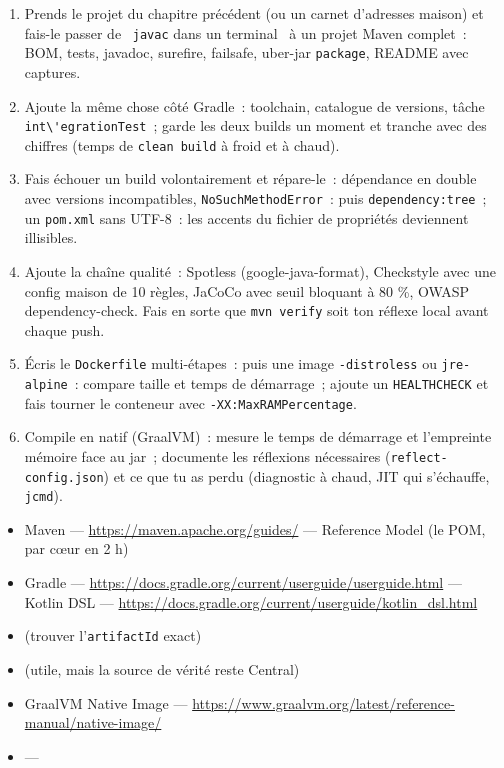 \begin{exercice}
\begin{enumerate}
  \item Prends le projet du chapitre pr\'ec\'edent (ou un carnet d'adresses maison) et fais-le passer
        de \og ~\verb|javac| dans un terminal~ \fg{} \`a un projet Maven complet~: BOM, tests, javadoc,
        surefire, failsafe, uber-jar \verb|package|, README avec captures.
  \item Ajoute la m\^eme chose c\^ot\'e Gradle~: toolchain, catalogue de versions, t\^ache
        \verb|int\'egrationTest|~; garde les deux builds un moment et tranche avec des chiffres
        (temps de \verb|clean build| \`a froid et \`a chaud).
  \item Fais \'echouer un build volontairement et r\'epare-le~: d\'ependance en double avec versions
        incompatibles, \verb|NoSuchMethodError|~: puis \verb|dependency:tree|~; un \verb|pom.xml|
        sans UTF-8~: les accents du fichier de propri\'et\'es deviennent illisibles.
  \item Ajoute la cha\^ine qualit\'e~: Spotless (google-java-format), Checkstyle avec une config
        maison de 10 r\`egles, JaCoCo avec seuil bloquant \`a 80 \%, OWASP dependency-check.
        Fais en sorte que \verb|mvn verify| soit ton r\'eflexe local avant chaque push.
  \item \'Ecris le \verb|Dockerfile| multi-\'etapes~: puis une image \verb|-distroless| ou
        \verb|jre-alpine|~: compare taille et temps de d\'emarrage~; ajoute un \verb|HEALTHCHECK|
        et fais tourner le conteneur avec \verb|-XX:MaxRAMPercentage|.
  \item Compile en natif (GraalVM)~: mesure le temps de d\'emarrage et l'empreinte m\'emoire face au
        jar~; documente les r\'eflexions n\'ecessaires (\verb|reflect-config.json|) et ce que tu as
        perdu (diagnostic \`a chaud, JIT qui s'\'echauffe, \verb|jcmd|).
\end{enumerate}
\end{exercice}

\begin{ressources}
\begin{itemize}
  \item Maven --- \url{https://maven.apache.org/guides/} --- Reference Model (le POM, par c\oe{}ur en 2 h)
  \item Gradle --- \url{https://docs.gradle.org/current/userguide/userguide.html} --- Kotlin DSL --- \url{https://docs.gradle.org/current/userguide/kotlin_dsl.html}
  \item {} (trouver l'\verb|artifactId| exact)
  \item {} (utile, mais la source de v\'erit\'e reste Central)
  \item GraalVM Native Image --- \url{https://www.graalvm.org/latest/reference-manual/native-image/}
  \item {} --- 
\end{itemize}
\end{ressources}

